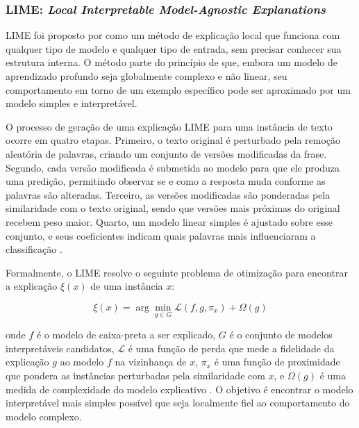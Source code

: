 \documentclass[
    12pt,                %
    openright,           %
    oneside,             %
    a4paper,             %
    english,             %
    brazil               %
]{abntex2}
\begin{document}
\subsubsection{LIME: \textit{Local Interpretable Model-Agnostic Explanations}}
\label{subsec:lime}

\label{subsubsec:lime_funcionamento}

LIME foi proposto por  como um método de 
explicação local que funciona com qualquer tipo de modelo e qualquer 
tipo de entrada, sem precisar conhecer sua estrutura interna. O método 
parte do princípio de que, embora um modelo de aprendizado profundo 
seja globalmente complexo e não linear, seu comportamento em torno 
de um exemplo específico pode ser aproximado por um modelo simples 
e interpretável.

O processo de geração de uma explicação LIME para uma instância de 
texto ocorre em quatro etapas. Primeiro, o texto original é perturbado 
pela remoção aleatória de palavras, criando um conjunto 
de versões modificadas da frase. Segundo, cada versão modificada é 
submetida ao modelo para que ele produza uma predição, permitindo 
observar se e como a resposta muda conforme as palavras são alteradas. 
Terceiro, as versões modificadas são ponderadas pela similaridade com 
o texto original, sendo que versões mais próximas do original recebem 
peso maior. Quarto, um modelo linear simples é ajustado sobre esse 
conjunto, e seus coeficientes indicam quais palavras mais influenciaram 
a classificação \cite{ribeiro2016}.

Formalmente, o LIME resolve o seguinte problema de otimização 
para encontrar a explicação $\xi(x)$ de uma instância $x$:

\begin{equation}
\xi(x) = \arg\min_{g \in G} \mathcal{L}(f, g, \pi_x) + \Omega(g)
\label{eq:lime}
\end{equation}

onde $f$ é o modelo de caixa-preta a ser explicado, $G$ é o 
conjunto de modelos interpretáveis candidatos, $\mathcal{L}$ é 
uma função de perda que mede a fidelidade da explicação $g$ ao 
modelo $f$ na vizinhança de $x$, $\pi_x$ é uma função de 
proximidade que pondera as instâncias perturbadas pela 
similaridade com $x$, e $\Omega(g)$ é uma medida de 
complexidade do modelo explicativo \cite{ribeiro2016}. O 
objetivo é encontrar o modelo interpretável mais simples 
possível que seja localmente fiel ao comportamento do modelo 
complexo.
\end{document}
